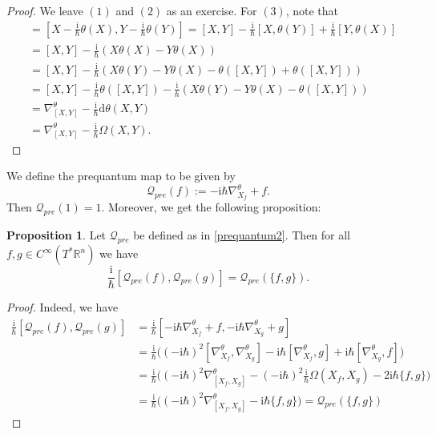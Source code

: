 \documentclass[11pt]{amsart}
\numberwithin{equation}{section}
\theoremstyle{plain}
\theoremstyle{definition}
\newtheorem{prop}{Proposition}[subsection]
\theoremstyle{remark}
\newcommand{\R}{\mathbb{R}}
\newcommand{\dd}{{\mathrm{d}}}
\newcommand{\I}{\mathrm{i}}
\begin{document}
\begin{proof}
We leave $(1)$ and $(2)$ as an exercise. For $(3)$, note that 
\begin{align*}
[\nabla^\theta_X,\nabla^\theta_Y]&=\left[X-\frac{\I}{\hbar}\theta(X),Y-\frac{\I}{\hbar}\theta(Y)\right]=[X,Y]-\frac{\I}{\hbar}[X,\theta(Y)]+\frac{\I}{\hbar}[Y,\theta(X)]\\
&=[X,Y]-\frac{\I}{\hbar}(X\theta(X)-Y\theta(X))\\
&=[X,Y]-\frac{\I}{\hbar}(X\theta(Y)-Y\theta(X)-\theta([X,Y])+\theta([X,Y]))\\
&=[X,Y]-\frac{\I}{\hbar}\theta([X,Y])-\frac{\I}{\hbar}(X\theta(Y)-Y\theta(X)-\theta([X,Y]))\\
&=\nabla^\theta_{[X,Y]}-\frac{\I}{\hbar}\dd\theta(X,Y)\\
&=\nabla^\theta_{[X,Y]}-\frac{\I}{\hbar}\Omega(X,Y).
\end{align*}
\end{proof}

We define the prequantum map to be given by  
\begin{equation}
\label{prequantum2}
\mathscr{Q}_{pre}(f):=-\I\hbar\nabla_{X_f}^\theta+f. 
\end{equation}
Then $\mathscr{Q}_{pre}(1)=1$. Moreover, we get the following proposition:

\begin{prop}
Let $\mathscr{Q}_{pre}$ be defined as in \eqref{prequantum2}. Then for all $f,g\in C^\infty(T^*\R^n)$ we have
\[
\frac{\I}{\hbar}[\mathscr{Q}_{pre}(f),\mathscr{Q}_{pre}(g)]=\mathscr{Q}_{pre}(\{f,g\}).
\]
\end{prop}

\begin{proof}
Indeed, we have 
\begin{align*}
\frac{\I}{\hbar}[\mathscr{Q}_{pre}(f),\mathscr{Q}_{pre}(g)]&=\frac{\I}{\hbar}[-\I\hbar\nabla^\theta_{X_f}+f,-\I\hbar \nabla^\theta_{X_g}+g]\\
&=\frac{\I}{\hbar}\Big((-\I\hbar)^2[\nabla^\theta_{X_f},\nabla^\theta_{X_g}]-\I\hbar[\nabla^\theta_{X_f},g]+\I\hbar[\nabla^\theta_{X_g},f]\Big)\\
&=\frac{\I}{\hbar}\Big((-\I\hbar)^2\nabla^\theta_{[X_f,X_g]}-(-\I\hbar)^2\frac{\I}{\hbar}\Omega(X_f,X_g)-2\I\hbar\{f,g\}\Big)\\
&=\frac{\I}{\hbar}\Big((-\I\hbar)^2\nabla^\theta_{[X_f,X_g]}-\I\hbar\{f,g\}\Big)=\mathscr{Q}_{pre}(\{f,g\})
\end{align*}
\end{proof}
\end{document}
